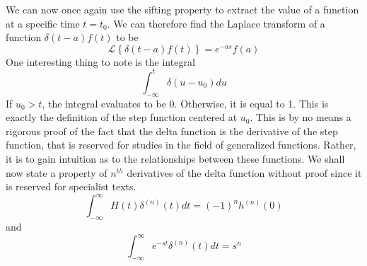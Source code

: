 \documentclass{report}
\theoremstyle{definition}
\theoremstyle{remark}
\newcommand{\lapt}[1]{\mathscr{L}\left\{ #1\right\}}
\begin{document}
We can now once again use the sifting property to extract the value of a function at a specific time $t=t_0$. We can therefore find the Laplace transform of a function $\delta(t-a)f(t)$ to be 
\begin{equation*}
    \lapt{\delta(t-a)f(t)} = e^{-as}f(a)
\end{equation*}
One interesting thing to note is the integral 
\begin{equation*}
    \int^t_{-\infty} \delta (u-u_0)du
\end{equation*}
If $u_0 >t$, the integral evaluates to be 0. Otherwise, it is equal to 1. This is exactly the definition of the step function centered at $u_0$. This is by no means a rigorous proof of the fact that the delta function is the derivative of the step function, that is reserved for studies in the field of generalized functions. Rather, it is to gain intuition as to the relationships between these functions. We shall now state a property of $n^{th}$ derivatives of the delta function without proof since it is reserved for specialist texts.
\begin{equation*}
    \int^\infty_{-\infty} H(t) \delta^{(n)}(t) dt = (-1)^nh^{(n)}(0)
\end{equation*}
and 
\begin{equation*}
    \int^\infty _{-\infty} e^{-st} \delta^{(n)}(t)dt = s^n
\end{equation*}
\end{document}
